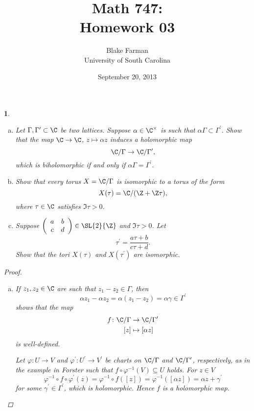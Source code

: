 \documentclass[10pt]{amsart}
\author{Blake Farman\\University of South Carolina}
\title{Math 747:\\Homework 03}
\date{September 20, 2013}
\begin{document}
\maketitle

\providecommand{\p}{\mathfrak{p}}
\providecommand{\m}{\mathfrak{m}}

\newtheorem{thm}{}
\newtheorem{lem}{Lemma}
\newtheorem{prop}{Proposition}
\theoremstyle{definition}
\newtheorem{defn}{Definition}[thm]

\newcommand{\A}{\mathbb{A}}

\begin{thm}
  \begin{enumerate}[(a)]
    \item
      Let $\Gamma, \Gamma^\prime \subset \C$ be two lattices.
      Suppose $\alpha \in \C^\times$ is such that $\alpha \Gamma \subset \Gamma^\prime$.
      Show that the map $\C \rightarrow \C$, $z \mapsto \alpha z$ induces a holomorphic map 
      $$\C/\Gamma \rightarrow \C/\Gamma^\prime,$$
      which is biholomorphic if and only if $\alpha \Gamma = \Gamma^\prime$.
    \item
      Show that every torus $X = \C / \Gamma$ is isomorphic to a torus of the form
      $$X(\tau) = \C/(\Z + \Z\tau),$$
      where $\tau \in \C$ satisfies $\Im{\tau} > 0$.
    \item
      Suppose $\left(\begin{array}{cc}
        a & b\\
        c & d
        \end{array}\right) \in \SL{2}{\Z}$
      and $\Im{\tau} > 0$.
      Let 
      $$\tau^\prime = \frac{a \tau + b}{c \tau + d}.$$
      Show that the tori $X(\tau)$ and $X(\tau^\prime)$ are isomorphic.
  \end{enumerate}

  \begin{proof}
    \begin{enumerate}[(a)]
    \item
      If $z_1, z_2 \in \C$ are such that $z_1 - z_2 \in \Gamma$, then
      $$\alpha z_1 - \alpha z_2 = \alpha(z_1 - z_2) = \alpha\gamma \in \Gamma^\prime$$
      shows that the map
      \begin{align*}
        f \colon \C/\Gamma &\rightarrow \C/\Gamma^\prime\\
        [z] &\mapsto [\alpha z]
      \end{align*}
      is well-defined.
      
      Let $\varphi \colon U \rightarrow V$ and $\varphi^\prime \colon U^\prime \rightarrow V^\prime$ be charts on $\C / \Gamma$ and $\C / \Gamma^\prime$, respectively, as in the example in Forster such that $f \circ \varphi^{-1}(V) \subseteq U$ holds.
      For $z \in V$
      $$\varphi^{-1} \circ f \circ \varphi^\prime (z) = \varphi^{-1} \circ f ([z]) = \varphi^{-1}([\alpha z]) = \alpha z + \gamma^\prime$$
      for some $\gamma^\prime \in \Gamma^\prime$, which is holomorphic.
      Hence $f$ is a holomorphic map.


\end{enumerate}
\end{proof}
\end{thm}
\end{document}
